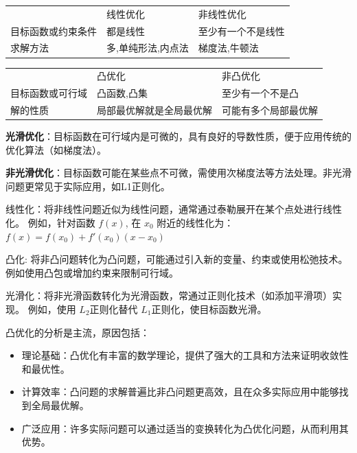 \documentclass[a4paper]{article}
\begin{document}
\begin{table}[H]
    \centering
    \begin{tabular}{lll}
         & 线性优化 & 非线性优化 \\
        目标函数或约束条件 & 都是线性 & 至少有一个不是线性 \\
        求解方法 & 多,单纯形法,内点法 & 梯度法,牛顿法 
    \end{tabular}
\end{table}
\begin{table}[H]
    \centering
    \begin{tabular}{lll}
         & 凸优化 & 非凸优化 \\
        目标函数或可行域 & 凸函数,凸集 & 至少有一个不是凸 \\
        解的性质 & 局部最优解就是全局最优解 & 可能有多个局部最优解
    \end{tabular}
\end{table}

\textbf{光滑优化}：目标函数在可行域内是可微的，具有良好的导数性质，便于应用传统的优化算法（如梯度法）。

\textbf{非光滑优化}：目标函数可能在某些点不可微，需使用次梯度法等方法处理。非光滑问题更常见于实际应用，如L1正则化。

线性化：将非线性问题近似为线性问题，通常通过泰勒展开在某个点处进行线性化。
例如，针对函数 $f(x)$, 在 $x_0$ 附近的线性化为：
$ f(x) = f(x_0) + f'(x_0)(x-x_0) $

凸化: 将非凸问题转化为凸问题，可能通过引入新的变量、约束或使用松弛技术。例如使用凸包或增加约束来限制可行域。

光滑化：将非光滑函数转化为光滑函数，常通过正则化技术（如添加平滑项）实现。
例如，使用  $L_2$正则化替代 $L_1$正则化，使目标函数光滑。

凸优化的分析是主流，原因包括：
\begin{itemize}
    \item 理论基础：凸优化有丰富的数学理论，提供了强大的工具和方法来证明收敛性和最优性。
    \item 计算效率：凸问题的求解普遍比非凸问题更高效，且在众多实际应用中能够找到全局最优解。
    \item 广泛应用：许多实际问题可以通过适当的变换转化为凸优化问题，从而利用其优势。
\end{itemize}


\section{}
\end{document}
